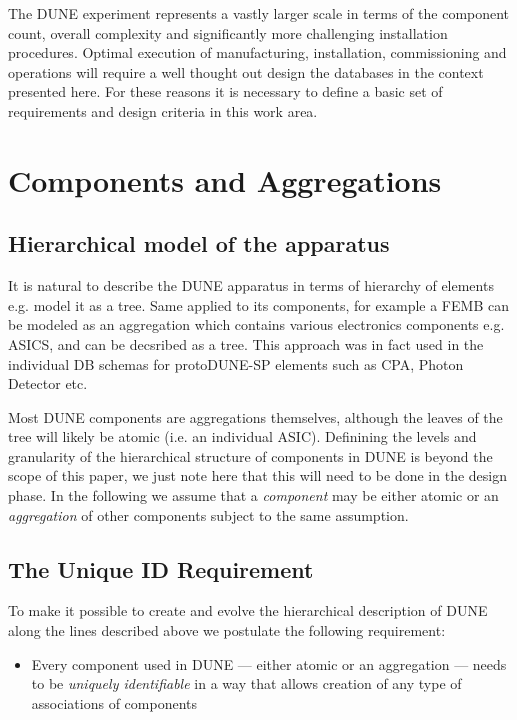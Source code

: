 \documentclass[pdftex,12pt,letter]{article}
\begin{document}
The DUNE experiment represents a vastly larger scale in terms of the component count,
overall complexity and significantly more challenging installation procedures. Optimal execution
of manufacturing, installation, commissioning and operations will require a well thought out design
the databases in the context presented here. For these reasons it is necessary to define a
basic set of requirements and design criteria in this work area.

\section{Components and Aggregations}
\subsection{Hierarchical model of the apparatus}

It is natural to describe the DUNE apparatus in terms of hierarchy of elements e.g. model it
as a tree. Same applied to its components, for example a FEMB can be modeled as an
aggregation which contains various electronics components e.g. ASICS, and can be decsribed as a tree.
This approach was in fact used in the individual DB schemas for protoDUNE-SP elements such as CPA, Photon Detector etc.

Most DUNE components are aggregations themselves, although the leaves of the tree will likely
be atomic (i.e. an individual ASIC).  Definining the levels and granularity of the hierarchical structure of components
in DUNE is beyond the scope of this paper, we just note here that this will need to be done in the design phase.
In the following we assume that a \textit{component} may be either atomic or an \textit{aggregation} of other components
subject to the same assumption.

\subsection{The Unique ID Requirement}

To make it possible to create and evolve the hierarchical description of DUNE along the lines described above
we postulate the following requirement:

\begin{itemize}

\item Every component used in DUNE ---  either atomic or an aggregation --- needs to be \textit{uniquely identifiable} in a way that allows
creation of any type of associations of components

\end{itemize}
\end{document}
